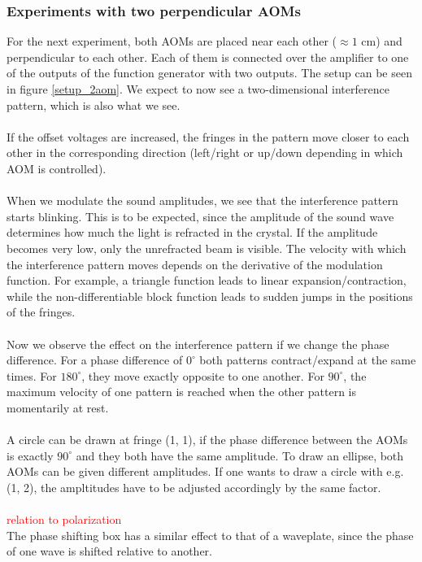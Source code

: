 \subsubsection{Experiments with two  perpendicular AOMs}
For the next experiment, both AOMs are placed near each other
($\approx 1$ cm) and perpendicular to each other. Each of them is 
connected over the amplifier to one of the outputs of the function generator
with two outputs. The setup can be seen in figure \ref{setup_2aom}.
We expect to now see a two-dimensional interference pattern, which
is also what we see. \\ \\ If the offset voltages are increased, the fringes
in the pattern move closer to each other in the corresponding direction
(left/right or up/down depending in which AOM is controlled). \\ \\
When we modulate the sound amplitudes, we see that the interference pattern
starts blinking. This is to be expected, since the amplitude of the
sound wave determines how much the light is refracted in the crystal.
If the amplitude becomes very low, only the unrefracted beam is visible.
The velocity with which the interference pattern moves depends on the
derivative of the modulation function. For example, a triangle function
leads to linear expansion/contraction, while the non-differentiable
block function leads to sudden jumps in the positions of the fringes.
\\ \\ Now we observe the effect on the interference pattern if we
change the phase difference. For a phase difference of $0^\circ$ both
patterns contract/expand at the same times. For $180^\circ$, they move
exactly opposite to one another. For $90^\circ$, the maximum velocity of one
pattern is reached when the other pattern is momentarily at rest. \\ \\
A circle can be drawn at fringe (1, 1),
if the phase difference between the AOMs is
exactly $90^\circ$ and they both have the same amplitude. To draw an
ellipse, both AOMs can be given different amplitudes. If one wants to
draw a circle with e.g. (1, 2), the ampltitudes have to be adjusted
accordingly by the same factor. \\ \\
\textcolor{red}{relation to polarization} \\
The phase shifting box has a similar effect to that of a waveplate,
since the phase of one wave is shifted relative to another. \\ \\
